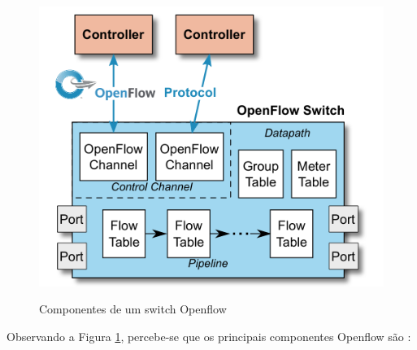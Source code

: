 \begin{figure}[!h]
    \caption{Componentes de um switch Openflow}
    \centering
    \includegraphics[scale=0.4]{Imagens/mainComponentesOpenflow.png}
    \label{mainComponents}
\end{figure}


Observando a Figura \ref{mainComponents}, percebe-se que os principais componentes Openflow são :

